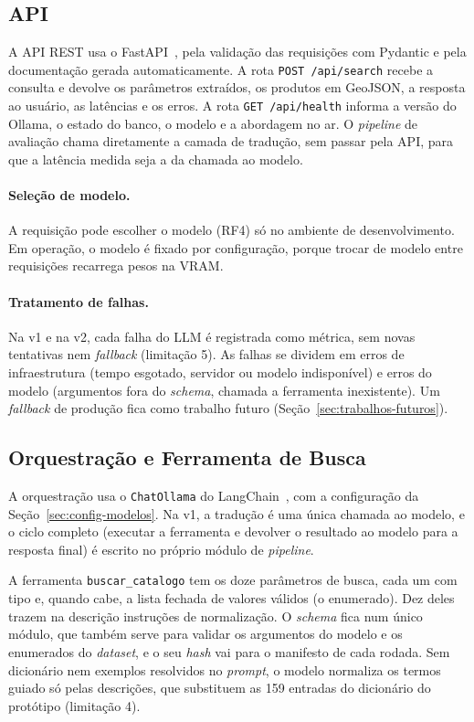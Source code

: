 \subsection{API}
\label{sec:api}

A API REST usa o FastAPI~\cite{fastapi2018}, pela validação das requisições com Pydantic e pela documentação gerada automaticamente. A rota \texttt{POST /api/search} recebe a consulta e devolve os parâmetros extraídos, os produtos em GeoJSON, a resposta ao usuário, as latências e os erros. A rota \texttt{GET /api/health} informa a versão do Ollama, o estado do banco, o modelo e a abordagem no ar. O \textit{pipeline} de avaliação chama diretamente a camada de tradução, sem passar pela API, para que a latência medida seja a da chamada ao modelo.

\paragraph{Seleção de modelo.} A requisição pode escolher o modelo (RF4) só no ambiente de desenvolvimento. Em operação, o modelo é fixado por configuração, porque trocar de modelo entre requisições recarrega pesos na VRAM.

\paragraph{Tratamento de falhas.} Na v1 e na v2, cada falha do LLM é registrada como métrica, sem novas tentativas nem \textit{fallback} (limitação 5). As falhas se dividem em erros de infraestrutura (tempo esgotado, servidor ou modelo indisponível) e erros do modelo (argumentos fora do \textit{schema}, chamada a ferramenta inexistente). Um \textit{fallback} de produção fica como trabalho futuro (Seção~\ref{sec:trabalhos-futuros}).

\subsection{Orquestração e Ferramenta de Busca}
\label{sec:orquestracao}

A orquestração usa o \texttt{ChatOllama} do LangChain~\cite{langchain2022}, com a configuração da Seção~\ref{sec:config-modelos}. Na v1, a tradução é uma única chamada ao modelo, e o ciclo completo (executar a ferramenta e devolver o resultado ao modelo para a resposta final) é escrito no próprio módulo de \textit{pipeline}.

A ferramenta \texttt{buscar\_catalogo} tem os doze parâmetros de busca, cada um com tipo e, quando cabe, a lista fechada de valores válidos (o enumerado). Dez deles trazem na descrição instruções de normalização. O \textit{schema} fica num único módulo, que também serve para validar os argumentos do modelo e os enumerados do \textit{dataset}, e o seu \textit{hash} vai para o manifesto de cada rodada. Sem dicionário nem exemplos resolvidos no \textit{prompt}, o modelo normaliza os termos guiado só pelas descrições, que substituem as 159 entradas do dicionário do protótipo (limitação 4).


